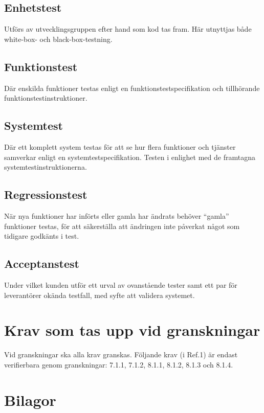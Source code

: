 \documentclass[a4paper]{article}
\begin{document}
\subsection{Enhetstest}

Utförs av utvecklingsgruppen efter hand som kod tas fram. Här utnyttjas både white-box- och black-box-testning.

\subsection{Funktionstest}

Där enskilda funktioner testas enligt en funktionstestspecifikation och tillhörande funktionstestinstruktioner. 

\subsection{Systemtest}

Där ett komplett system testas för att se hur flera funktioner och tjänster samverkar enligt en systemtestspecifikation. Testen i enlighet med de framtagna systemtestinstruktionerna. 

\subsection{Regressionstest}

När nya funktioner har införts eller gamla har ändrats behöver ``gamla'' funktioner testas, för att säkerställa att ändringen inte påverkat något som tidigare godkänts i test.

\subsection{Acceptanstest}

Under vilket kunden utför ett urval av ovanstående tester samt ett par för leverantörer okända testfall, med syfte att validera systemet.

\section{Krav som tas upp vid granskningar}

Vid granskningar ska alla krav granskas.
Följande krav (i Ref.1) är endast verifierbara genom granskningar: 7.1.1, 7.1.2, 8.1.1, 8.1.2, 8.1.3 och 8.1.4.

\section{Bilagor}
\end{document}
